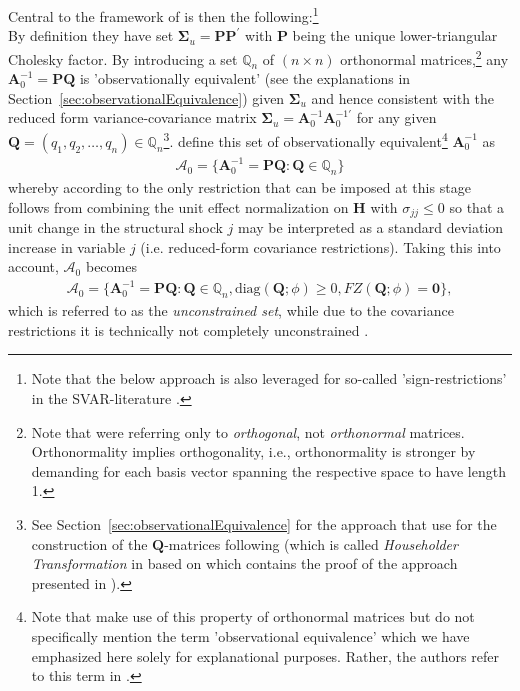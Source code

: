 \documentclass[a4paper,11pt,listof=nochaptergap,oneside,pointednumbers,bibtotoc,bigheadings,liststotoc,hidelinks]{scrbook}
\theoremstyle{mysatz}
\theoremstyle{mydefinition}
\theoremstyle{mytheorem}
\theoremstyle{mybemerkung}
\newcommand{\vect}[1]{\boldsymbol{\mathbf{#1}}}
\begin{document}
Central to the framework of \citet{ludvigsonetal:19} is then the following:\footnote{Note that the below approach is also leveraged for so-called 'sign-restrictions' in the SVAR-literature \citep{lutkepohlkilian:17}.} \\
By definition they have set $\vect{\Sigma}_u = \vect{P}\vect{P}^'$ with $\vect{P}$ being the unique lower-triangular Cholesky factor. By introducing a set $\mathbb{Q}_n$ of $(n \times n)$ orthonormal matrices,\footnote{Note that \citet{rubioetal:10} were referring only to \textit{orthogonal}, not \textit{orthonormal} matrices. Orthonormality implies orthogonality, i.e., orthonormality is stronger by demanding for each basis vector spanning the respective space to have length 1.} any $\vect{A}_0^{-1} = \vect{P}\vect{Q}$ is 'observationally equivalent' (see the explanations in Section~\ref{sec:observationalEquivalence}) given $\vect{\Sigma}_u$ and hence consistent with the reduced form variance-covariance matrix $\vect{\Sigma}_u = \vect{A}_0^{-1}\vect{A}_0^{-1'}$ for any given $\vect{Q} = (q_1, q_2, \dots, q_n) \in \mathbb{Q}_n$\footnote{See Section~\ref{sec:observationalEquivalence} for the approach that \citet{ludvigsonetal:19} use for the construction of the $\vect{Q}$-matrices following \citet{rubioetal:10} (which is called \textit{Householder Transformation} in \citet{lutkepohlkilian:17} based on \citet{stewart:80} which contains the proof of the approach presented in \citet{rubioetal:10}).}. \citet{ludvigsonetal:19} define this set of observationally equivalent\footnote{Note that \citet{ludvigsonetal:19} make use of this property of orthonormal matrices but do not specifically mention the term 'observational equivalence' which we have emphasized here solely for explanational purposes. Rather, the authors refer to this term in \citet{ludvigsonetal:17}.} $\vect{A}_0^{-1}$ as 
\begin{equation} \label{eq:svar_ludvi6}
\begin{split}
 			\mathcal{A}_0 = \{\vect{A}_0^{-1} = \vect{P}\vect{Q}: \vect{Q} \in \mathbb{Q}_n\}
\end{split}								
\end{equation}
whereby according to \citet{ludvigsonetal:19} the only restriction that can be imposed at this stage follows from combining the unit effect normalization on $\vect{H}$ with $\sigma_{jj} \leq 0$ so that a unit change in the structural shock $j$ may be interpreted as a standard deviation increase in variable $j$ (i.e. reduced-form covariance restrictions). Taking this into account, $\mathcal{A}_0$ becomes
\begin{equation} \label{eq:svar_ludvi7}
\begin{split}
 			\vect{\mathcal{A}}_0 = \{\vect{A}_0^{-1} = \vect{P}\vect{Q}: \vect{Q} \in \mathbb{Q}_n, \text{diag}(\vect{Q}; \phi) \geq 0, FZ(\vect{Q}; \phi) = \vect{0}\},
\end{split}								
\end{equation}
which is referred to as the \textit{unconstrained set}, while due to the covariance restrictions it is technically not completely unconstrained \citep{ludvigsonetal:19}.
\end{document}
